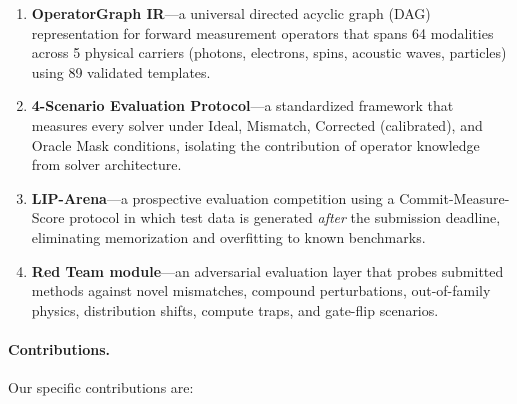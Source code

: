 \begin{enumerate}
  \item \textbf{OperatorGraph IR}---a universal directed acyclic graph
        (DAG) representation for forward measurement operators that
        spans 64 modalities across 5 physical carriers (photons,
        electrons, spins, acoustic waves, particles) using 89 validated
        templates.
  \item \textbf{4-Scenario Evaluation Protocol}---a standardized
        framework that measures every solver under Ideal, Mismatch,
        Corrected (calibrated), and Oracle Mask conditions,
        isolating the contribution of operator knowledge from solver
        architecture.
  \item \textbf{LIP-Arena}---a prospective evaluation competition using
        a Commit-Measure-Score protocol in which test data is generated
        \emph{after} the submission deadline, eliminating memorization
        and overfitting to known benchmarks.
  \item \textbf{Red Team module}---an adversarial evaluation layer that
        probes submitted methods against novel mismatches, compound
        perturbations, out-of-family physics, distribution shifts,
        compute traps, and gate-flip scenarios.
\end{enumerate}


\paragraph{Contributions.}
Our specific contributions are:

